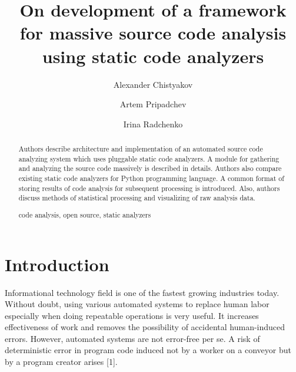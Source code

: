 \documentclass[runningheads,a4paper]{llncs}
\newcommand{\keywords}[1]{\par\addvspace\baselineskip
\noindent\keywordname\enspace\ignorespaces#1}
\begin{document}
\mainmatter  %

\title{On development of a framework\\for massive source code analysis\\
using static code analyzers}


\author{Alexander Chistyakov
\and Artem Pripadchev\and Irina Radchenko}
%


\maketitle


\begin{abstract}
  Authors describe architecture and implementation of an automated source code
  analyzing system which uses pluggable static code analyzers. A module for
  gathering and analyzing the source code massively is described in details.
  Authors also compare existing static code analyzers for Python programming
  language. A common format of storing results of code analysis for subsequent
  processing is introduced. Also, authors discuss methods of statistical
  processing and visualizing of raw analysis data.
\keywords{code analysis, open source, static analyzers}
\end{abstract}


\section{Introduction}

Informational technology field is one of the fastest growing industries today.
Without doubt, using various automated systems to replace human labor especially
when doing repeatable operations is very useful. It increases effectiveness
of work and removes the possibility of accidental human-induced errors.
However, automated systems are not error-free per se. A risk of deterministic
error in program code induced not by a worker on a conveyor but by
a program creator arises [1].
\end{document}
